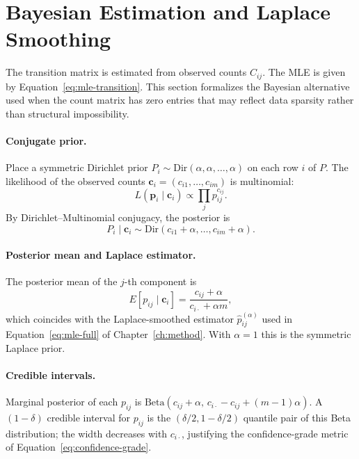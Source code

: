 \section{Bayesian Estimation and Laplace Smoothing}
\label{app:G-bayes}

The transition matrix is estimated from observed counts $C_{ij}$. The MLE
is given by Equation~\ref{eq:mle-transition}. This section formalizes the
Bayesian alternative used when the count matrix has zero entries that may
reflect data sparsity rather than structural impossibility.

\paragraph{Conjugate prior.} Place a symmetric Dirichlet prior
$P_i \sim \mathrm{Dir}(\alpha, \alpha, \ldots, \alpha)$ on each row $i$ of
$P$. The likelihood of the observed counts $\mathbf{c}_i = (c_{i1},
\ldots, c_{im})$ is multinomial:
\begin{equation}
L(\mathbf{p}_i \mid \mathbf{c}_i) \propto \prod_{j} p_{ij}^{c_{ij}}.
\end{equation}
By Dirichlet–Multinomial conjugacy, the posterior is
\begin{equation}
P_i \mid \mathbf{c}_i \sim
\mathrm{Dir}(c_{i1} + \alpha, \ldots, c_{im} + \alpha).
\end{equation}

\paragraph{Posterior mean and Laplace estimator.} The posterior mean of
the $j$-th component is
\begin{equation}
\label{eq:G-laplace}
E[p_{ij} \mid \mathbf{c}_i]
= \frac{c_{ij} + \alpha}{c_{i\cdot} + \alpha m},
\end{equation}
which coincides with the Laplace-smoothed estimator
$\hat{p}_{ij}^{(\alpha)}$ used in
Equation~\ref{eq:mle-full} of Chapter~\ref{ch:method}. With $\alpha = 1$
this is the symmetric Laplace prior.

\paragraph{Credible intervals.} Marginal posterior of each $p_{ij}$ is
$\mathrm{Beta}(c_{ij} + \alpha,\, c_{i\cdot} - c_{ij} + (m-1)\alpha)$.
A $(1-\delta)$ credible interval for $p_{ij}$ is the
$(\delta/2, 1-\delta/2)$ quantile pair of this Beta distribution; the
width decreases with $c_{i\cdot}$, justifying the confidence-grade metric
of Equation~\ref{eq:confidence-grade}.


